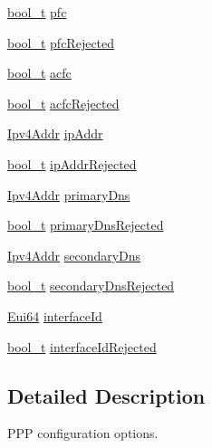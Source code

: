 \begin{DoxyCompactItemize}
\hyperlink{compiler__port_8h_a812d16e5494522586b3784e55d479912}{bool\+\_\+t} \hyperlink{structPppConfig_acfbd1b69c9b717719aaf259d13dec22c}{pfc}
\item 
\hyperlink{compiler__port_8h_a812d16e5494522586b3784e55d479912}{bool\+\_\+t} \hyperlink{structPppConfig_ad0a3d11bc1ea16a96f5395594bedccfa}{pfc\+Rejected}
\item 
\hyperlink{compiler__port_8h_a812d16e5494522586b3784e55d479912}{bool\+\_\+t} \hyperlink{structPppConfig_a78ea406e50d3ce395d25069882da54c5}{acfc}
\item 
\hyperlink{compiler__port_8h_a812d16e5494522586b3784e55d479912}{bool\+\_\+t} \hyperlink{structPppConfig_afa2500aa7a1dd71b77864f9f72d224b7}{acfc\+Rejected}
\item 
\hyperlink{ipv4_8h_a411debb3d770caa0c06d3f73367da37f}{Ipv4\+Addr} \hyperlink{structPppConfig_af660facff4e0e42d8a58b59a50fee065}{ip\+Addr}
\item 
\hyperlink{compiler__port_8h_a812d16e5494522586b3784e55d479912}{bool\+\_\+t} \hyperlink{structPppConfig_ae86961aa0868a5627e6431cefa5f2a3d}{ip\+Addr\+Rejected}
\item 
\hyperlink{ipv4_8h_a411debb3d770caa0c06d3f73367da37f}{Ipv4\+Addr} \hyperlink{structPppConfig_ab4911101beaedfe7933f62a0562a2ea7}{primary\+Dns}
\item 
\hyperlink{compiler__port_8h_a812d16e5494522586b3784e55d479912}{bool\+\_\+t} \hyperlink{structPppConfig_aa526bb25849e6e5a08909475f9fa4903}{primary\+Dns\+Rejected}
\item 
\hyperlink{ipv4_8h_a411debb3d770caa0c06d3f73367da37f}{Ipv4\+Addr} \hyperlink{structPppConfig_ab76ca0298c010c786b8785cd976495a8}{secondary\+Dns}
\item 
\hyperlink{compiler__port_8h_a812d16e5494522586b3784e55d479912}{bool\+\_\+t} \hyperlink{structPppConfig_ab2667e0958465df3bed8abf9dcdbff24}{secondary\+Dns\+Rejected}
\item 
\hyperlink{ethernet_8h_acbcae3afd042b3ce97e42f54013c8137}{Eui64} \hyperlink{structPppConfig_ae6c52269b209ba51baac4f58357456f8}{interface\+Id}
\item 
\hyperlink{compiler__port_8h_a812d16e5494522586b3784e55d479912}{bool\+\_\+t} \hyperlink{structPppConfig_aede61e90dffb9365e98e1301e4c3f273}{interface\+Id\+Rejected}
\end{DoxyCompactItemize}


\subsection{Detailed Description}
P\+PP configuration options. 

